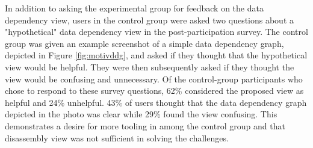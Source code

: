 In addition to asking the experimental group for feedback on the data dependency view, users in the control group were asked two questions about a "hypothetical" data dependency view in the post-participation survey. The control group was given an example screenshot of a simple data dependency graph, depicted in Figure \ref{fig:motivddg}, and asked if they thought that the hypothetical view would be helpful. They were then subsequently asked if they thought the view would be confusing and unnecessary. Of the control-group participants who chose to respond to these survey questions, 62\% considered the proposed view as helpful and 24\% unhelpful. 43\% of users thought that the data dependency graph depicted in the photo was clear while 29\% found the view confusing. This demonstrates a desire for more tooling in  among the control group and that disassembly view was not sufficient in solving the challenges.